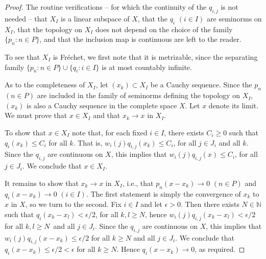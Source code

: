 \documentclass[12pt, reqno]{amsart}
\numberwithin{equation}{section}
\theoremstyle{plain}
\theoremstyle{definition}
\begin{document}
\begin{proof}
The routine verifications -- for which the continuity of the $q_{i,j}$ is not needed -- that $X_I$ is a linear subspace of $X$, that the $q_i$ $(i\in I)$ are seminorms on $X_I$, that the topology on $X_I$ does not depend on the choice of the family $\{p_n : n\in P\}$, and that the inclusion map is continuous are left to the reader.

To see that $X_I$ is Fr\'echet, we first note that it is metrizable, since the separating family $\{p_n : n\in P\}\cup \{q_i : i\in I\}$ is at most countably infinite.

As to the completeness of $X_I$, let ${({x_k})}\subset X_I$ be a Cauchy sequence. Since the $p_n$ $(n\in P)$ are included in the family of seminorms defining the topology on $X_I$, ${({x_k})}$ is also a Cauchy sequence in the complete space $X$. Let $x$ denote its limit. We must prove that $x\in X_I$ and that $x_k\to x$ in $X_I$.

To show that $x\in X_I$ note that, for each fixed $i\in I$, there exists $C_i\geq 0$ such that $q_i(x_k)\leq C_i$ for all $k$.  That is, $w_i(j)q_{i,j}(x_k)\leq C_i$, for all $j\in J_i$ and all $k$. Since the $q_{i,j}$ are continuous on $X$, this implies that $w_i(j)q_{i,j}(x)\leq C_i$, for all $j\in J_i$. We conclude that $x\in X_I$.

It remains to show that $x_k\to x$ in $X_I$, i.e., that $p_n(x-x_k)\to 0$ $(n\in P)$ and $q_i(x-x_k)\to 0$ $(i\in I)$. The first statement is simply the convergence of $x_k$ to $x$ in $X$, so we turn to the second. Fix $i\in I$ and let $\epsilon >0$. Then there exists $N\in\mathbb N$ such that $q_i(x_k-x_l)<\epsilon/2$, for all $k,l\geq N$, hence $w_i(j)q_{i,j}(x_k-x_l)<\epsilon/2$ for all $k,l\geq N$\ and all $j\in J_i$.  Since the $q_{i,j}$ are continuous on $X$, this implies that $w_i(j)q_{i,j}(x-x_k)\leq \epsilon/2$ for all $k\geq N$ and all $j\in J_i$. We conclude that $q_i(x-x_k)\leq\epsilon/2 <\epsilon$ for all $k\geq N$. Hence $q_i(x-x_k)\to 0$, as required.
\end{proof}
\end{document}
